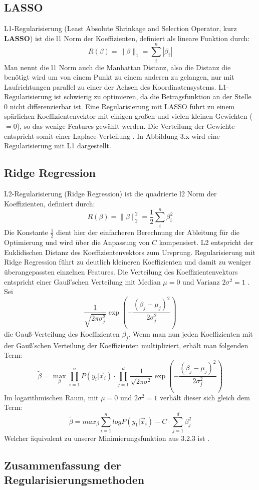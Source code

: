 \subsection{LASSO}
L1-Regularisierung (Least Absolute Shrinkage and Selection Operator, kurz \textbf{LASSO}) ist die l1 Norm der Koeffizienten, definiert als lineare Funktion durch:
\begin{displaymath}
R(\beta) = \parallel \beta \parallel_1 = \sum_{i}^n|\beta_i|
\end{displaymath}
Man nennt die l1 Norm auch die Manhattan Distanz, also die Distanz die benötigt wird um von einem Punkt zu einem anderen zu gelangen, nur mit Laufrichtungen parallel zu einer der Achsen des Koordinatensystems. L1-Regularisierung ist schwierig zu optimieren, da die Betragsfunktion an der Stelle 0 nicht differenzierbar ist. Eine Regularisierung mit LASSO führt zu einem spärlichen Koeffizientenvektor mit einigen großen und vielen kleinen Gewichten ($=0$), so das wenige Features gewählt werden. Die Verteilung der Gewichte entspricht somit einer Laplace-Verteilung \cite{JUR}. In Abbildung 3.x wird eine Regularisierung mit L1 dargestellt.
\subsection{Ridge Regression}

L2-Regularisierung (Ridge Regression) ist die quadrierte l2 Norm der Koeffizienten, definiert durch:
\begin{displaymath}
R(\beta)= \parallel \beta \parallel_2^2= \dfrac{1}{2} \sum_{i}^n \beta_i^2
\end{displaymath}
Die Konstante $\frac{1}{2}$ dient hier der einfacheren Berechnung der Ableitung für die Optimierung und wird über die Anpassung von $C$ kompensiert. L2 entspricht der Euklidischen Distanz des Koeffizientenvektors zum Ursprung. Regularisierung mit Ridge Regression führt zu deutlich kleineren Koeffizienten und damit zu weniger überangepassten einzelnen Features. Die Verteilung des Koeffizientenvektors entspricht einer Gauß'schen Verteilung mit Median $\mu = 0$ und Varianz $ 2 \sigma^2 = 1$ \cite{JUR}.
Sei 
\begin{displaymath}
\dfrac{1}{\sqrt{2\pi \sigma_j^2}}\exp\left(-\dfrac{(\beta_j-\mu_j)^2}{2\sigma_j^2}\right)
\end{displaymath}
die Gauß-Verteilung des Koeffizienten $\beta_j$. Wenn man nun jeden Koeffizienten mit der Gauß'schen Verteilung der Koeffizienten multipliziert, erhält man folgenden Term:
\begin{displaymath}
\tilde{\beta} = \max_{\beta} \prod_{i=1}^n P(y_i | \vec x_i) \cdot \prod_{j=1}^d \dfrac{1}{\sqrt{2\pi \sigma^2}}\exp\left(-\dfrac{(\beta_j-\mu_j)^2}{2\sigma_j^2}\right)
\end{displaymath}
Im logarithmischen Raum, mit $\mu =0$ und $2\sigma^2 = 1$ verhält dieser sich gleich dem Term: 
\begin{displaymath}
\tilde{\beta} = max_\beta \sum_{i=1}^n logP(y_1 | \vec x_i)-C \cdot \sum_{j=1}^d \beta_j^2
\end{displaymath}
Welcher äquivalent zu unserer Minimierungsfunktion aus 3.2.3 ist \cite{JUR}.
\subsection{Zusammenfassung der Regularisierungsmethoden}
